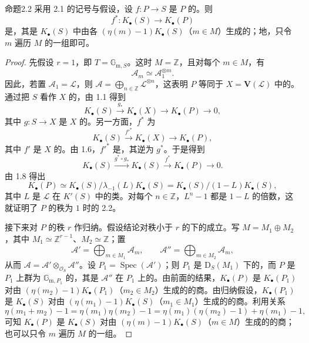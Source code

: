 \begin{SGAresult}{命题}{2.2}
采用 2.1 的记号与假设，设 $f:P\to S$ 是 $P$ 的。则
\[
f^*:K_\bullet(S)\longrightarrow K_\bullet(P)
\]
是，其是 $K_\bullet(S)$ 中由各 $(\eta(m)-1)K_\bullet(S)$（$m\in M$）生成的；地，只令 $m$ 遍历 $M$ 的一组即可。
\end{SGAresult}
\begin{proof}
先假设 $r=1$，即 $T=\mathbb G_{\mathrm m,S}$。这时 $M=\mathbb Z$，且对每个 $m\in M$，有
\[
\mathcal A_m\simeq\mathcal A_1^{\otimes m}.
\]
因此，若置 $\mathcal A_1=\mathcal L$，则 $\mathcal A=\bigoplus_{n\in\mathbb Z}\mathcal L^{\otimes n}$，这表明 $P$ 等同于 $X=\mathbf V(\mathcal L)$ 中的。通过把 $S$ 看作 $X$ 的，由 1.1 得到
\[
K_\bullet(S)\xrightarrow{g_*}K_\bullet(X)\longrightarrow K_\bullet(P)\longrightarrow0,
\]
其中 $g:S\to X$ 是 $X$ 的。另一方面，$f^*$ 为
\[
K_\bullet(S)\xrightarrow{f'^*}K_\bullet(X)\longrightarrow K_\bullet(P),
\]
其中 $f'$ 是 $X$ 的。由 1.6，$f'^*$ 是，其逆为 $g^*$。于是得到
\[
K_\bullet(S)\xrightarrow{g^*\circ g_*}K_\bullet(S)\xrightarrow{f^*}K_\bullet(P)\longrightarrow0.
\]
由 1.8 得出
\[
K_\bullet(P)\simeq K_\bullet(S)/\lambda_{-1}(L)K_\bullet(S)
=K_\bullet(S)/(1-L)K_\bullet(S),
\]
其中 $L$ 是 $\mathcal L$ 在 $K'(S)$ 中的类。对每个 $n\in\mathbb Z$，$L^n-1$ 都是 $1-L$ 的倍数，这就证明了 $P$ 的秩为 $1$ 时的 2.2。

接下来对 $P$ 的秩 $r$ 作归纳。假设结论对秩小于 $r$ 的下的成立。写 $M=M_1\oplus M_2$，其中 $M_1\simeq\mathbb Z^{r-1}$、$M_2\simeq\mathbb Z$；置
\[
\mathcal A'=\bigoplus_{m\in M_1}\mathcal A_m,\qquad
\mathcal A''=\bigoplus_{m\in M_2}\mathcal A_m,
\]
从而 $\mathcal A=\mathcal A'\otimes_{\mathcal O_S}\mathcal A''$。设 $P_1=\operatorname{Spec}(\mathcal A')$；则 $P_1$ 是 $\mathrm D_S(M_1)$ 下的，而 $P$ 是 $P_1$ 上群为 $\mathbb G_{\mathrm m,P_1}$ 的，其是 $\mathcal A''$ 在 $P_1$ 上的。由前面的结果，$K_\bullet(P)$ 是 $K_\bullet(P_1)$ 对由 $(\eta(m_2)-1)K_\bullet(P_1)$（$m_2\in M_2$）生成的的商。由归纳假设，$K_\bullet(P_1)$ 是 $K_\bullet(S)$ 对由 $(\eta(m_1)-1)K_\bullet(S)$（$m_1\in M_1$）生成的的商。利用关系
\[
\eta(m_1+m_2)-1=\eta(m_1)\eta(m_2)-1
=\eta(m_1)(\eta(m_2)-1)+\eta(m_1)-1,
\]
可知 $K_\bullet(P)$ 是 $K_\bullet(S)$ 对由 $(\eta(m)-1)K_\bullet(S)$（$m\in M$）生成的的商；也可以只令 $m$ 遍历 $M$ 的一组。
\end{proof}

